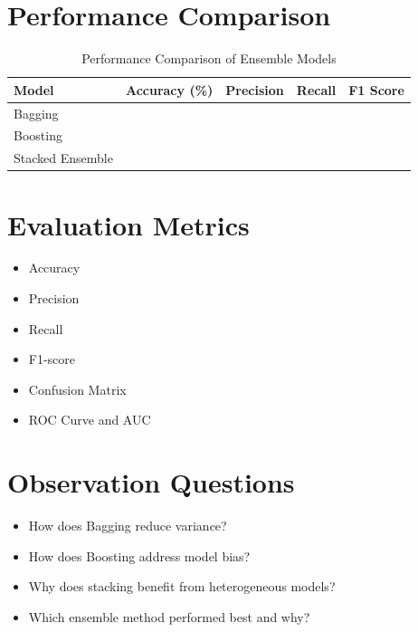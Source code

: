 \documentclass[11pt]{article}
\begin{document}

\section*{Performance Comparison}

\begin{table}[h!]
\centering
\caption{Performance Comparison of Ensemble Models}
\begin{tabular}{lcccc}
\toprule
Model & Accuracy (\%) & Precision & Recall & F1 Score \\
\midrule
Bagging &  &  &  &  \\
Boosting &  &  &  &  \\
Stacked Ensemble &  &  &  &  \\
\bottomrule
\end{tabular}
\end{table}


\section*{Evaluation Metrics}
\begin{itemize}
    \item Accuracy
    \item Precision
    \item Recall
    \item F1-score
    \item Confusion Matrix
    \item ROC Curve and AUC
\end{itemize}


\section*{Observation Questions}
\begin{itemize}
    \item How does Bagging reduce variance?
    \item How does Boosting address model bias?
    \item Why does stacking benefit from heterogeneous models?
    \item Which ensemble method performed best and why?
\end{itemize}

\end{document}
